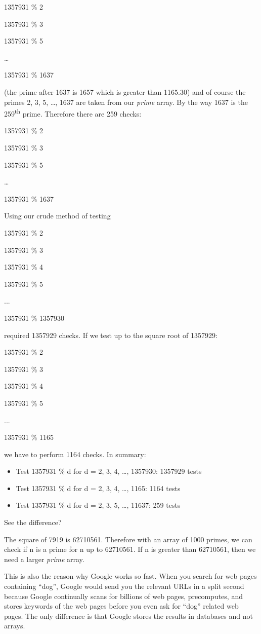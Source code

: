 \documentclass[
]{article}
\providecommand{\tightlist}{%
  \setlength{\itemsep}{0pt}\setlength{\parskip}{0pt}}
\begin{document}
1357931 \% 2

1357931 \% 3

1357931 \% 5

\ldots{}

1357931 \% 1637

(the prime after 1637 is 1657 which is greater than 1165.30) and of
course the primes 2, 3, 5, \ldots, 1637 are taken from our \emph{prime}
array. By the way 1637 is the 259\textsuperscript{th} prime. Therefore
there are 259 checks:

1357931 \% 2

1357931 \% 3

1357931 \% 5

\ldots{}

1357931 \% 1637

Using our crude method of testing

1357931 \% 2

1357931 \% 3

1357931 \% 4

1357931 \% 5

...

1357931 \% 1357930

required 1357929 checks. If we test up to the square root of 1357929:

1357931 \% 2

1357931 \% 3

1357931 \% 4

1357931 \% 5

...

1357931 \% 1165

we have to perform 1164 checks. In summary:

\begin{itemize}
\tightlist
\item
  Test 1357931 \% d for d = 2, 3, 4, \ldots, 1357930: 1357929 tests
\item
  Test 1357931 \% d for d = 2, 3, 4, \ldots, 1165: 1164 tests
\item
  Test 1357931 \% d for d = 2, 3, 5, \ldots, 11637: 259 tests
\end{itemize}

See the difference?

The square of 7919 is 62710561. Therefore with an array of 1000 primes,
we can check if n is a prime for n up to 62710561. If n is greater than
62710561, then we need a larger \emph{prime} array.

This is also the reason why Google works so fast. When you search for
web pages containing ``dog'', Google would send you the relevant URLs in
a split second because Google continually scans for billions of web
pages, precomputes, and stores keywords of the web pages before you even
ask for ``dog'' related web pages. The only difference is that Google
stores the results in databases and not arrays.
\end{document}
